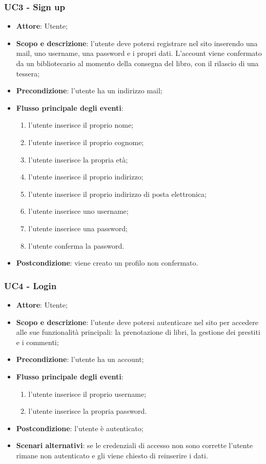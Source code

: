 \subsubsection{UC3 - Sign up}
\begin{itemize}
	\item \textbf{Attore}: Utente;
	\item \textbf{Scopo e descrizione}: l'utente deve potersi registrare nel sito inserendo una mail, uno username, una password e i propri dati. L'account viene confermato da un bibliotecario al momento della consegna del libro, con il rilascio di una tessera;
	\item \textbf{Precondizione}: l'utente ha un indirizzo mail;
	\item \textbf{Flusso principale degli eventi}:
	\begin{enumerate}
		\item l'utente inserisce il proprio nome;
		\item l'utente inserisce il proprio cognome;
		\item l'utente inserisce la propria età;
		\item l'utente inserisce il proprio indirizzo;
		\item l'utente inserisce il proprio indirizzo di posta elettronica;
		\item l'utente inserisce uno username;
		\item l'utente inserisce una password;
		\item l'utente conferma la password.
	\end{enumerate} 
	\item \textbf{Postcondizione}: viene creato un profilo non confermato.
\end{itemize}

\subsubsection{UC4 - Login}
\begin{itemize}
	\item \textbf{Attore}: Utente;
	\item \textbf{Scopo e descrizione}: l'utente deve potersi autenticare nel sito per accedere alle sue funzionalità principali: la prenotazione di libri, la gestione dei prestiti e i commenti;
	\item \textbf{Precondizione}: l'utente ha un account;
	\item \textbf{Flusso principale degli eventi}:
	\begin{enumerate}
		\item l'utente inserisce il proprio username;
		\item l'utente inserisce la propria password.
	\end{enumerate} 
	\item \textbf{Postcondizione}: l'utente è autenticato;
	\item \textbf{Scenari alternativi}: se le credenziali di accesso non sono corrette l'utente rimane non autenticato e gli viene chiesto di reinserire i dati.
\end{itemize}

